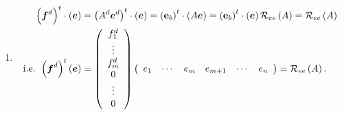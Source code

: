 \documentclass[aps,preprint]{revtex4}%
\begin{document}
\begin{enumerate}
\begin{enumerate}
\begin{enumerate}
\item
\begin{align}
\left(  \boldsymbol{f}^{d}\right)  ^{t}\cdot\left(  \boldsymbol{e}\right)   &
=\left(  A^{d}\boldsymbol{e}^{d}\right)  ^{t}\cdot\left(  \boldsymbol{e}%
\right)  =\left(  \mathbf{e}_{b}\right)  ^{t}\cdot\left(  A\boldsymbol{e}%
\right)  =\left(  \mathbf{e}_{b}\right)  ^{t}\cdot\left(  \boldsymbol{e}%
\right)  \mathcal{R}_{ee}\left(  A\right)  =\mathcal{R}_{ee}\left(  A\right)
\\
\text{i.e. }\left(  \boldsymbol{f}^{d}\right)  ^{t}\left(  \boldsymbol{e}%
\right)   &  =\left(
\begin{array}
[c]{c}%
f_{1}^{d}\\
\vdots\\
f_{m}^{d}\\
0\\
\vdots\\
0
\end{array}
\right)  \left(
\begin{array}
[c]{cccccc}%
e_{1} & \cdots & e_{m} & e_{m+1} & \cdots & e_{n}%
\end{array}
\right)  =\mathcal{R}_{ee}\left(  A\right)  .
\end{align}

\end{enumerate}


\end{enumerate}
\end{enumerate}
\end{document}
